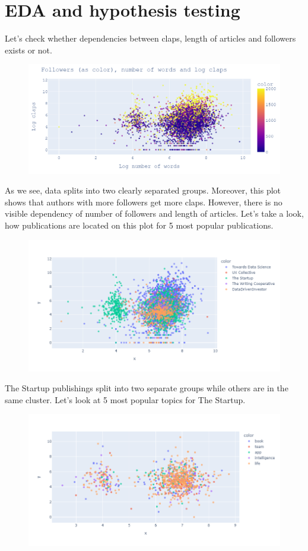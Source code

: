 \documentclass[12pt]{report}
\begin{document}
\section{EDA and hypothesis testing}
Let's check whether dependencies between claps, length of articles and followers exists or not.
\begin{figure}[H]
    \centering
    \includegraphics[scale=0.4]{eda1.png}
\end{figure}
As we see, data splits into two clearly separated groups. Moreover, this plot shows that authors with more followers get more claps. However, there is no visible dependency of number of followers and length of articles.
Let's take a look, how publications are located on this plot for 5 most popular publications.
\begin{figure}[H]
    \centering
    \includegraphics[scale=0.5]{eda2.png}
\end{figure}
The Startup publishings split into two separate groups while others are in the same cluster.
Let's look at 5 most popular topics for The Startup.
\begin{figure}[H]
    \centering
    \includegraphics[scale=0.5]{eda3.png}
\end{figure}
\end{document}
